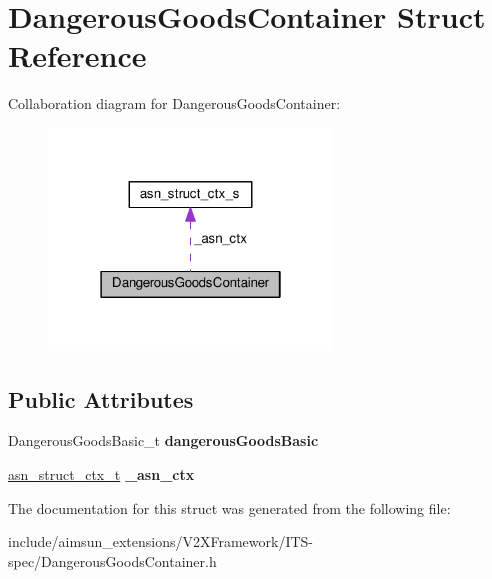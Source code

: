 \hypertarget{structDangerousGoodsContainer}{}\section{Dangerous\+Goods\+Container Struct Reference}
\label{structDangerousGoodsContainer}


Collaboration diagram for Dangerous\+Goods\+Container\+:\nopagebreak
\begin{figure}[H]
\begin{center}
\leavevmode
\includegraphics[width=214pt]{structDangerousGoodsContainer__coll__graph}
\end{center}
\end{figure}
\subsection*{Public Attributes}
\begin{DoxyCompactItemize}
\item 
Dangerous\+Goods\+Basic\+\_\+t {\bfseries dangerous\+Goods\+Basic}\hypertarget{structDangerousGoodsContainer_a36720e3457b36cfae8bcdae92c24d052}{}\label{structDangerousGoodsContainer_a36720e3457b36cfae8bcdae92c24d052}

\item 
\hyperlink{structasn__struct__ctx__s}{asn\+\_\+struct\+\_\+ctx\+\_\+t} {\bfseries \+\_\+asn\+\_\+ctx}\hypertarget{structDangerousGoodsContainer_ad259bfb360ac97a0450809e830347204}{}\label{structDangerousGoodsContainer_ad259bfb360ac97a0450809e830347204}

\end{DoxyCompactItemize}


The documentation for this struct was generated from the following file\+:\begin{DoxyCompactItemize}
\item 
include/aimsun\+\_\+extensions/\+V2\+X\+Framework/\+I\+T\+S-\/spec/Dangerous\+Goods\+Container.\+h\end{DoxyCompactItemize}

